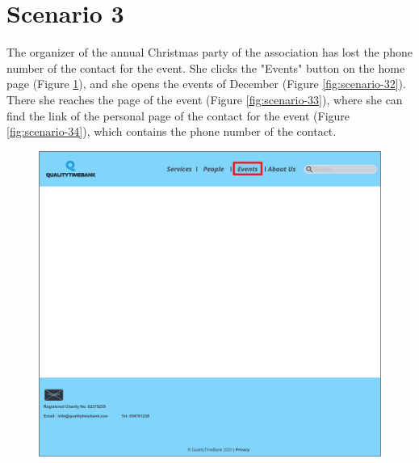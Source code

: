 \documentclass[a4paper, 11pt, parskip=half, headsepline]{scrreprt}
\begin{document}
\section{Scenario 3}

The organizer of the annual Christmas party of the association has lost the phone number of the contact for the event. She clicks the "Events" button on the home page (Figure \ref{fig:scenario-31}), and she opens the events of December (Figure \ref{fig:scenario-32}). There she reaches the page of the event (Figure \ref{fig:scenario-33}), where she can find the link of the personal page of the contact for the event (Figure \ref{fig:scenario-34}), which contains the phone number of the contact.

\begin{figure}[H]
    \begin{minipage}[t]{0.5\textwidth}
        \centering
    	\includegraphics[width=0.9\linewidth, keepaspectratio]{scenarios/scenario-31}
    	\caption{}
    	\label{fig:scenario-31}
    \end{minipage}
    \hspace*{\fill}
    \begin{minipage}[t]{0.5\textwidth}
        \centering

\end{minipage}
\end{figure}
\end{document}
